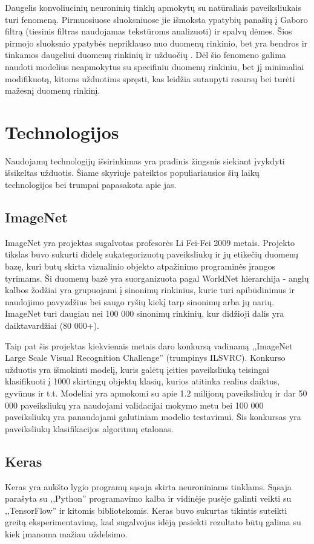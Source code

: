 \documentclass{VUMIFPSkursinis}
\begin{document}
Daugelis konvoliucinių neuroninių tinklų apmokytų su natūraliais paveiksliukais turi fenomeną. Pirmuosiuose sluoksniuose jie išmoksta ypatybių panašių į Gaboro filtrą 
(tiesinis filtras naudojamas tekstūroms analizuoti) ir spalvų dėmes. Šios pirmojo sluoksnio ypatybės nepriklauso nuo duomenų rinkinio, bet yra bendros ir tinkamos 
daugeliui duomenų rinkinių ir užduočių \cite{DBLP:journals/corr/YosinskiCBL14}. Dėl šio fenomeno galima naudoti modelius neapmokytus su specifiniu duomenų rinkiniu, 
bet jį minimaliai modifikuotą, kitoms užduotims spręsti, kas leidžia sutaupyti resursų bei turėti mažesnį duomenų rinkinį.

\section{Technologijos}
Naudojamų technologijų išsirinkimas yra pradinis žingsnis siekiant įvykdyti išsikeltas užduotis. Šiame skyriuje pateiktos populiariausios šių laikų technologijos 
bei trumpai papasakota apie jas.

\subsection{ImageNet}
ImageNet yra projektas sugalvotas profesorės Li Fei-Fei 2009 metais. Projekto tikslas buvo sukurti didelę sukategorizuotų paveiksliukų ir jų etikečių duomenų bazę, 
kuri butų skirta vizualinio objekto atpažinimo programinės įrangos tyrimams. Ši duomenų bazė yra suorganizuota pagal WorldNet hierarchija - anglų kalbos žodžiai 
yra grupuojami į sinonimų rinkinius, kurie turi apibūdinimus ir naudojimo pavyzdžius bei saugo ryšių kiekį tarp sinonimų arba jų narių. ImageNet turi daugiau nei 
100 000 sinonimų rinkinių, kur didžioji dalis yra daiktavardžiai (80 000+). 

Taip pat šis projektas kiekvienais metais daro konkursą vadinamą ,,ImageNet Large Scale Visual Recognition Challenge'' (trumpinys ILSVRC). Konkurso užduotis yra 
išmokinti modelį, kuris galėtų įeities paveiksliuką teisingai klasifikuoti į 1000 skirtingų objektų klasių, kurios atitinka realius daiktus, gyvūnus ir t.t. Modeliai 
yra apmokomi su apie 1.2 milijonų paveiksliukų ir dar 50 000 paveiksliukų yra naudojami validacijai mokymo metu bei 100 000 paveiksliukų yra panaudojami galutiniam 
modelio testavimui. Šis konkursas yra paveiksliukų klasifikacijos algoritmų etalonas.

\subsection{Keras}
Keras yra aukšto lygio programų sąsaja skirta neuroniniams tinklams. Sąsaja parašyta su ,,Python'' programavimo kalba ir vidinėje pusėje galinti veikti su ,,TensorFlow'' 
ir kitomis bibliotekomis. Keras buvo sukurtas tikintis suteikti greitą eksperimentavimą, kad sugalvojus idėją pasiekti rezultato būtų galima su kiek įmanoma mažiau uždelsimo.
\end{document}
